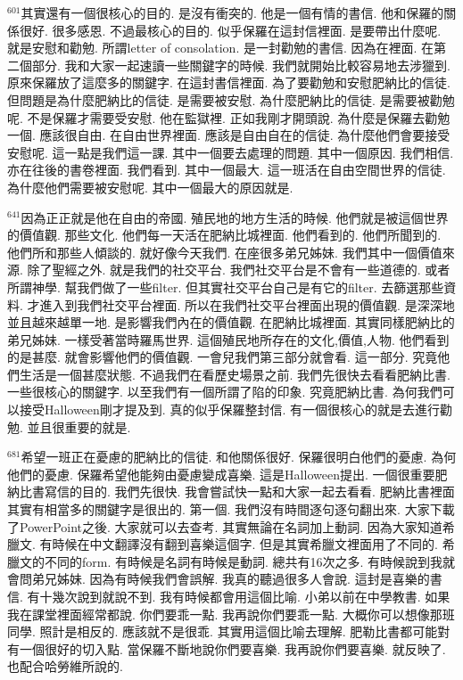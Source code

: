 \documentclass{book}
\begin{document}
$^{601}$其實還有一個很核心的目的.
是沒有衝突的.
他是一個有情的書信.
他和保羅的關係很好.
很多感恩.
不過最核心的目的.
似乎保羅在這封信裡面.
是要帶出什麼呢.
就是安慰和勸勉.
所謂letter of consolation.
是一封勸勉的書信.
因為在裡面.
在第二個部分.
我和大家一起速讀一些關鍵字的時候.
我們就開始比較容易地去涉獵到.
原來保羅放了這麼多的關鍵字.
在這封書信裡面.
為了要勸勉和安慰肥納比的信徒.
但問題是為什麼肥納比的信徒.
是需要被安慰.
為什麼肥納比的信徒.
是需要被勸勉呢.
不是保羅才需要受安慰.
他在監獄裡.
正如我剛才開頭說.
為什麼是保羅去勸勉一個.
應該很自由.
在自由世界裡面.
應該是自由自在的信徒.
為什麼他們會要接受安慰呢.
這一點是我們這一課.
其中一個要去處理的問題.
其中一個原因.
我們相信.
亦在往後的書卷裡面.
我們看到.
其中一個最大.
這一班活在自由空間世界的信徒.
為什麼他們需要被安慰呢.
其中一個最大的原因就是.

$^{641}$因為正正就是他在自由的帝國.
殖民地的地方生活的時候.
他們就是被這個世界的價值觀.
那些文化.
他們每一天活在肥納比城裡面.
他們看到的.
他們所聞到的.
他們所和那些人傾談的.
就好像今天我們.
在座很多弟兄姊妹.
我們其中一個價值來源.
除了聖經之外.
就是我們的社交平台.
我們社交平台是不會有一些道德的.
或者所謂神學.
幫我們做了一些filter.
但其實社交平台自己是有它的filter.
去篩選那些資料.
才進入到我們社交平台裡面.
所以在我們社交平台裡面出現的價值觀.
是深深地並且越來越單一地.
是影響我們內在的價值觀.
在肥納比城裡面.
其實同樣肥納比的弟兄姊妹.
一樣受著當時羅馬世界.
這個殖民地所存在的文化,價值,人物.
他們看到的是甚麼.
就會影響他們的價值觀.
一會兒我們第三部分就會看.
這一部分.
究竟他們生活是一個甚麼狀態.
不過我們在看歷史場景之前.
我們先很快去看看肥納比書.
一些很核心的關鍵字.
以至我們有一個所謂了陷的印象.
究竟肥納比書.
為何我們可以接受Halloween剛才提及到.
真的似乎保羅整封信.
有一個很核心的就是去進行勸勉.
並且很重要的就是.

$^{681}$希望一班正在憂慮的肥納比的信徒.
和他關係很好.
保羅很明白他們的憂慮.
為何他們的憂慮.
保羅希望他能夠由憂慮變成喜樂.
這是Halloween提出.
一個很重要肥納比書寫信的目的.
我們先很快.
我會嘗試快一點和大家一起去看看.
肥納比書裡面其實有相當多的關鍵字是很出的.
第一個.
我們沒有時間逐句逐句翻出來.
大家下載了PowerPoint之後.
大家就可以去查考.
其實無論在名詞加上動詞.
因為大家知道希臘文.
有時候在中文翻譯沒有翻到喜樂這個字.
但是其實希臘文裡面用了不同的.
希臘文的不同的form.
有時候是名詞有時候是動詞.
總共有16次之多.
有時候說到我就會問弟兄姊妹.
因為有時候我們會誤解.
我真的聽過很多人會說.
這封是喜樂的書信.
有十幾次說到就說不到.
我有時候都會用這個比喻.
小弟以前在中學教書.
如果我在課堂裡面經常都說.
你們要乖一點.
我再說你們要乖一點.
大概你可以想像那班同學.
照計是相反的.
應該就不是很乖.
其實用這個比喻去理解.
肥勒比書都可能對有一個很好的切入點.
當保羅不斷地說你們要喜樂.
我再說你們要喜樂.
就反映了.
也配合哈勞維所說的.
\end{document}
